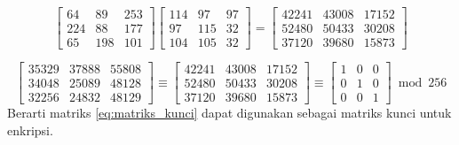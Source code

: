 \begin{equation}
\begin{bmatrix}
    64&    89&   253\\
   224&    88&   177\\
    65&   198&   101
\end{bmatrix}
\begin{bmatrix}
	114 & 97  & 97\\
	97  & 115 & 32\\
	104 & 105 & 32
\end{bmatrix}=
\begin{bmatrix}
   42241&   43008 &  17152\\
   52480&   50433 &  30208\\
   37120&   39680 &  15873
\end{bmatrix}
\end{equation}

\begin{equation}
\begin{bmatrix}
   35329&   37888&   55808\\
   34048&   25089&   48128\\
   32256&   24832&   48129
\end{bmatrix}\equiv
\begin{bmatrix}
   42241&   43008 &  17152\\
   52480&   50433 &  30208\\
   37120&   39680 &  15873
\end{bmatrix}\equiv
\begin{bmatrix}
   1&  0& 0\\
   0&   1&   0\\
   0&   0&   1
\end{bmatrix} \bmod 256
\end{equation}
Berarti matriks \ref{eq:matriks_kunci} dapat digunakan sebagai matriks kunci untuk enkripsi.

